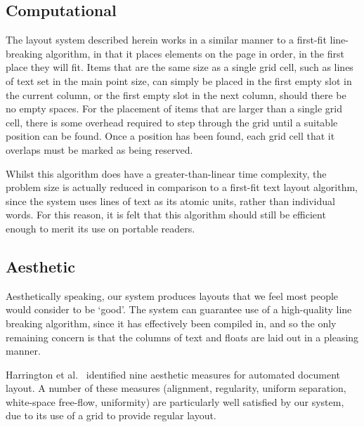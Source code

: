 \subsection{Computational}
The layout system described herein works in a similar manner to a first-fit line-breaking algorithm, in that it places elements on the page in order, in the first place they will fit. Items that are the same size as a single grid cell, such as lines of text set in the main point size, can simply be placed in the first empty slot in the current column, or the first empty slot in the next column, should there be no empty spaces.  For the placement of items that are larger than a single grid cell, there is some overhead required to step through the grid until a suitable position can be found. Once a position has been found, each grid cell that it overlaps must be marked as being reserved.

Whilst this algorithm does have a greater-than-linear time complexity, the problem size is actually reduced in comparison to a first-fit text layout algorithm, since the system uses lines of text as its atomic units, rather than individual words. For this reason, it is felt that this algorithm should still be efficient enough to merit its use on portable \ebook{} readers.



\subsection{Aesthetic}
Aesthetically speaking, our system produces layouts that we feel most people would consider to be `good'. The system can guarantee use of a high-quality line breaking algorithm, since it has effectively been compiled in, and so the only remaining concern is that the columns of text and floats are laid out in a pleasing manner.

Harrington et al.~\cite{Harrington2004} identified nine aesthetic measures for automated document layout. A number of these measures (alignment, regularity, uniform separation, white-space free-flow, uniformity) are particularly well satisfied by our system, due to its use of a grid to provide regular layout.

    

